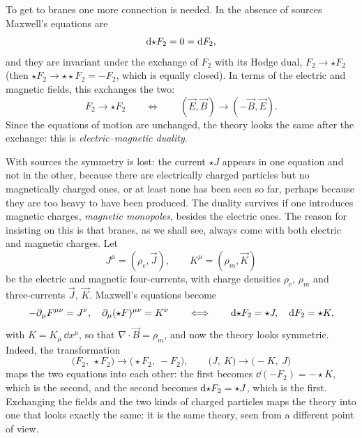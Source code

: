 To get to branes one more connection is needed. In the absence of sources Maxwell's equations are
\begin{equation}
  \mathrm{d}{\mathord{\star} F_2} = 0 = \mathrm{d} F_2 ,
  \label{eq:L4-free}
\end{equation}
and they are invariant under the exchange of $F_2$ with its Hodge dual, $F_2\to\star F_2$ (then $\star F_2\to\star\star F_2 = -F_2$, which is equally closed). In terms of the electric and magnetic fields, this exchanges the two:
\begin{equation}
  F_2\longrightarrow\star F_2
  \qquad\Longleftrightarrow\qquad
  (\vec E,\vec B)\longrightarrow(-\vec B,\vec E) .
  \label{eq:L4-EB}
\end{equation}
Since the equations of motion are unchanged, the theory looks the same after the exchange: this is \emph{electric--magnetic duality}.

With sources the symmetry is lost: the current $\star J$ appears in one equation and not in the other, because there are electrically charged particles but no magnetically charged ones, or at least none has been seen so far, perhaps because they are too heavy to have been produced. The duality survives if one introduces magnetic charges, \emph{magnetic monopoles}, besides the electric ones. The reason for insisting on this is that branes, as we shall see, always come with both electric and magnetic charges. Let
\begin{equation*}
  J^\mu = (\rho_e,\vec J) ,\qquad K^\mu = (\rho_m,\vec K)
\end{equation*}
be the electric and magnetic four-currents, with charge densities $\rho_e$, $\rho_m$ and three-currents $\vec J$, $\vec K$. Maxwell's equations become
\begin{equation}
  -\partial_\mu F^{\mu\nu} = J^\nu ,\quad \partial_\mu(\star F)^{\mu\nu} = K^\nu
  \qquad\Longleftrightarrow\qquad
  \mathrm{d}{\mathord{\star} F_2} = \star J ,\quad \mathrm{d} F_2 = \star K ,
  \label{eq:L4-maxwell-sources}
\end{equation}
with $K = K_\mu\,\dd x^\mu$, so that $\nabla\cdot\vec B = \rho_m$, and now the theory looks symmetric. Indeed, the transformation
\begin{equation}
  \bigl(F_2,\ \star F_2\bigr)\longrightarrow\bigl(\star F_2,\ -F_2\bigr) ,\qquad
  \bigl(J,\ K\bigr)\longrightarrow\bigl(-K,\ J\bigr)
  \label{eq:L4-duality}
\end{equation}
maps the two equations into each other: the first becomes $\dd(-F_2) = -\star K$, which is the second, and the second becomes $\mathrm{d}\mathord{\star} F_2 = \star J$, which is the first. Exchanging the fields and the two kinds of charged particles maps the theory into one that looks exactly the same: it is the same theory, seen from a different point of view.

